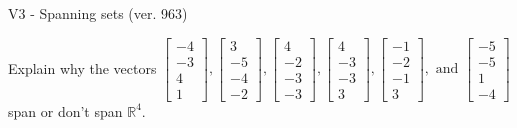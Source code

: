 \begin{exercise}
  \begin{exerciseTitle}V3 - Spanning sets (ver. 963)\end{exerciseTitle}
  \begin{exerciseStatement}
    Explain why the vectors \(\left[\begin{array}{r}
-4 \\
-3 \\
4 \\
1
\end{array}\right] , \left[\begin{array}{r}
3 \\
-5 \\
-4 \\
-2
\end{array}\right] , \left[\begin{array}{r}
4 \\
-2 \\
-3 \\
-3
\end{array}\right] , \left[\begin{array}{r}
4 \\
-3 \\
-3 \\
3
\end{array}\right] , \left[\begin{array}{r}
-1 \\
-2 \\
-1 \\
3
\end{array}\right] , \text{ and } \left[\begin{array}{r}
-5 \\
-5 \\
1 \\
-4
\end{array}\right]\) span or don't span \(\mathbb{R}^4\). 
	



\end{exerciseStatement}
\end{exercise}
